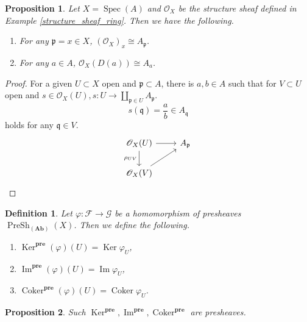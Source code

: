 \documentclass{article}
\newtheorem{proposition}{Proposition}[section]
\newtheorem{definition}{Definition}[section]
\numberwithin{equation}{section}
\DeclareMathOperator{\Spec}{Spec}
\DeclareMathOperator{\PreSh}{PreSh}
\DeclareMathOperator{\Ker}{Ker}
\DeclareMathOperator{\Image}{Im}
\DeclareMathOperator{\Coker}{Coker}
\begin{document}
\begin{proposition}
Let $X=\Spec(A)$ and $\mathcal{O}_X$ be the structure sheaf defined in Example \ref{structure_sheaf_ring}. Then we have the following.
\begin{enumerate}[1).]
\item For any $\mathfrak{p}=x\in X$, $(\mathcal{O}_{X})_x \cong A_{\mathfrak{p}}$.
\item For any $a\in A$, $\mathcal{O}_X(D(a)) \cong A_a$.
\end{enumerate}
\end{proposition}

\begin{proof}
For a given $U\subset X$ open and $\mathfrak{p}\subset A$, there is $a,b\in A$ such that for $V\subset U$ open and $s\in\mathcal{O}_X(U), s:U\to\coprod_{\mathfrak{p}\in U}A_{\mathfrak{p}}$.
\begin{equation*}
s(\mathfrak{q}) = {\frac a b}\in A_{\mathfrak{q}}
\end{equation*}
holds for any $\mathfrak{q}\in V$.
\[
\begin{tikzcd}
\mathcal{O}_X(U) \arrow[r] \arrow[d, "\rho_{UV}"'] & A_\mathfrak{p} \\
\mathcal{O}_X(V) \arrow[ru]                        &               
\end{tikzcd}
\]
\end{proof}

\begin{definition}
Let $\varphi:\mathcal{F}\to\mathcal{G}$ be a homomorphism of presheaves $\PreSh_{(\mathbf{Ab})}(X)$. Then we define the following.
\begin{enumerate}[1).]
\item $\Ker^{\mathbf{pre}}(\varphi)(U) = \Ker\varphi_U$,
\item $\Image^{\mathbf{pre}}(\varphi)(U) = \Image\varphi_U$,
\item $\Coker^{\mathbf{pre}}(\varphi)(U) = \Coker\varphi_U$.
\end{enumerate}
\end{definition}

\begin{proposition}
Such $\Ker^{\mathbf{pre}},\Image^{\mathbf{pre}},\Coker^{\mathbf{pre}}$ are presheaves.
\end{proposition}
\end{document}
